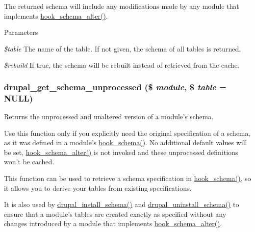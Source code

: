 The returned schema will include any modifications made by any module that implements \hyperlink{group__schemaapi_ga4a00aaeabd6903f707d8385476b9ae2a}{hook\_\-schema\_\-alter()}.


\begin{DoxyParams}{Parameters}
\item[{\em \$table}]The name of the table. If not given, the schema of all tables is returned. \item[{\em \$rebuild}]If true, the schema will be rebuilt instead of retrieved from the cache. \end{DoxyParams}
\hypertarget{group__schemaapi_gaecb0d63f03b96dd1426298804e091d3b}{
\subsubsection[{drupal\_\-get\_\-schema\_\-unprocessed}]{\setlength{\rightskip}{0pt plus 5cm}drupal\_\-get\_\-schema\_\-unprocessed (\$ {\em module}, \/  \$ {\em table} = {\ttfamily NULL})}}
\label{group__schemaapi_gaecb0d63f03b96dd1426298804e091d3b}
Returns the unprocessed and unaltered version of a module's schema.

Use this function only if you explicitly need the original specification of a schema, as it was defined in a module's \hyperlink{group__schemaapi_ga9abd926ddaf68a22e6dca28a25d0c6f5}{hook\_\-schema()}. No additional default values will be set, \hyperlink{group__schemaapi_ga4a00aaeabd6903f707d8385476b9ae2a}{hook\_\-schema\_\-alter()} is not invoked and these unprocessed definitions won't be cached.

This function can be used to retrieve a schema specification in \hyperlink{group__schemaapi_ga9abd926ddaf68a22e6dca28a25d0c6f5}{hook\_\-schema()}, so it allows you to derive your tables from existing specifications.

It is also used by \hyperlink{group__schemaapi_ga9706b8d6ecdac10302d83bd50935a698}{drupal\_\-install\_\-schema()} and \hyperlink{group__schemaapi_ga0688b6627af9dc05f2618f81489c3db0}{drupal\_\-uninstall\_\-schema()} to ensure that a module's tables are created exactly as specified without any changes introduced by a module that implements \hyperlink{group__schemaapi_ga4a00aaeabd6903f707d8385476b9ae2a}{hook\_\-schema\_\-alter()}.


